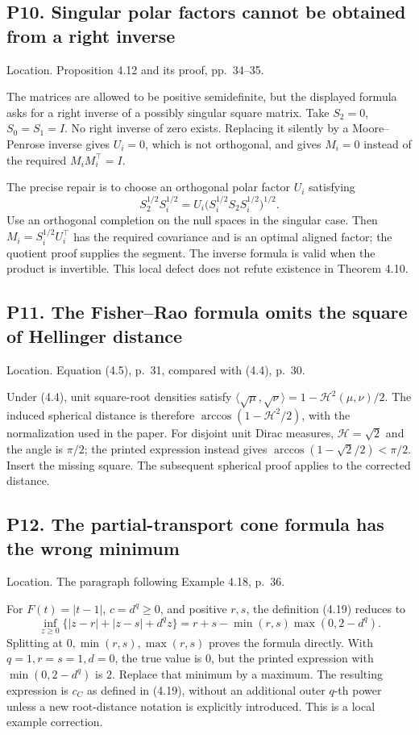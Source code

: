 \documentclass[10pt]{article}
\begin{document}
\subsection*{P10. Singular polar factors cannot be obtained from a right inverse}
Location. Proposition 4.12 and its proof, pp. 34–35.\par
The matrices are allowed to be positive semidefinite, but the displayed formula asks for a right inverse of a possibly singular square matrix. Take \(S_2=0\), \(S_0=S_1=I\). No right inverse of zero exists. Replacing it silently by a Moore–Penrose inverse gives \(U_i=0\), which is not orthogonal, and gives \(M_i=0\) instead of the required \(M_iM_i^\top=I\).\par
The precise repair is to choose an orthogonal polar factor \(U_i\) satisfying \[S_2^{1/2}S_i^{1/2}
 =U_i\bigl(S_i^{1/2}S_2S_i^{1/2}\bigr)^{1/2}.\] Use an orthogonal completion on the null spaces in the singular case. Then \(M_i=S_i^{1/2}U_i^\top\) has the required covariance and is an optimal aligned factor; the quotient proof supplies the segment. The inverse formula is valid when the product is invertible. This local defect does not refute existence in Theorem 4.10.\par
\subsection*{P11. The Fisher–Rao formula omits the square of Hellinger distance}
Location. Equation (4.5), p. 31, compared with (4.4), p. 30.\par
Under (4.4), unit square-root densities satisfy \(\langle\sqrt\mu,\sqrt\nu\rangle=1-\mathcal H^2(\mu,\nu)/2\). The induced spherical distance is therefore \(\arccos(1-\mathcal H^2/2)\), with the normalization used in the paper. For disjoint unit Dirac measures, \(\mathcal H=\sqrt2\) and the angle is \(\pi/2\); the printed expression instead gives \(\arccos(1-\sqrt2/2)<\pi/2\). Insert the missing square. The subsequent spherical proof applies to the corrected distance.\par
\subsection*{P12. The partial-transport cone formula has the wrong minimum}
Location. The paragraph following Example 4.18, p. 36.\par
For \(F(t)=|t-1|\), \(c=d^q\ge0\), and positive \(r,s\), the definition (4.19) reduces to \[\inf_{z\ge0}\{|z-r|+|z-s|+d^qz\}
 =r+s-\min(r,s)\max(0,2-d^q).\] Splitting at \(0,\min(r,s),\max(r,s)\) proves the formula directly. With \(q=1,r=s=1,d=0\), the true value is \(0\), but the printed expression with \(\min(0,2-d^q)\) is \(2\). Replace that minimum by a maximum. The resulting expression is \(c_C\) as defined in (4.19), without an additional outer \(q\)-th power unless a new root-distance notation is explicitly introduced. This is a local example correction.\par
\end{document}
